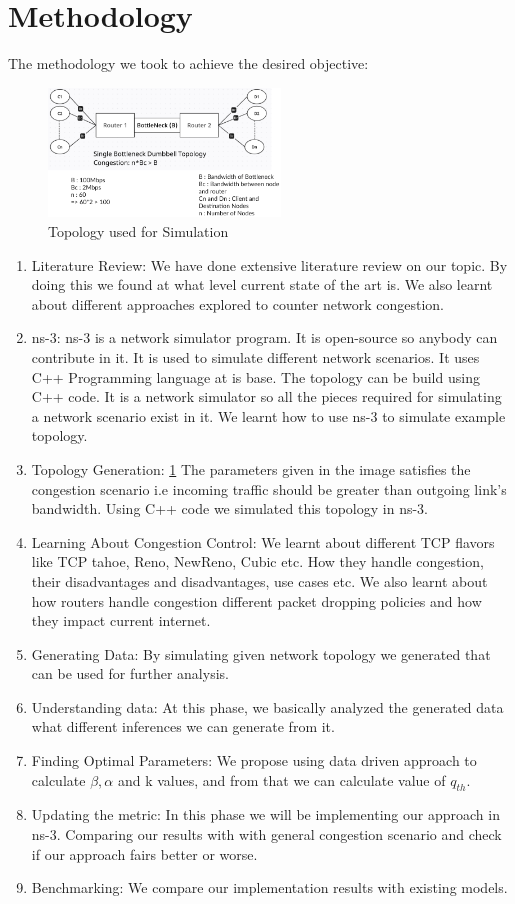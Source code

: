 \section{Methodology}
The methodology we took to achieve the desired objective:
\begin{figure}[h]
    \centering
    \includegraphics[width=0.55\textwidth]{./images/topology.png}
    \caption{\label{fig:myfig2} Topology used for Simulation}
\end{figure}
\begin{enumerate}
    \item Literature Review: We have done extensive literature review on our topic. By doing this we found at what level current state of the art is. We also learnt about different approaches explored to counter network congestion.
    \item ns-3: ns-3 is a network simulator program. It is open-source so anybody can contribute in it. It is used to simulate different network scenarios. It uses C++ Programming language at is base. The topology can be build using C++ code. It is a network simulator so all the pieces required for simulating a network scenario exist in it. We learnt how to use ns-3 to simulate example topology.
    \item Topology Generation: \ref{fig:myfig2} The parameters given in the image satisfies the congestion scenario i.e incoming traffic should be greater than outgoing link's bandwidth. Using C++ code we simulated this topology in ns-3.
    \item Learning About Congestion Control: We learnt about different TCP flavors like TCP tahoe, Reno, NewReno, Cubic etc. How they handle congestion, their disadvantages and disadvantages, use cases etc. We also learnt about how routers handle congestion different packet dropping policies and how they impact current internet.
    \item Generating Data: By simulating given network topology we generated that can be used for further analysis.
    \item Understanding data: At this phase, we basically analyzed the generated data what different inferences we can generate from it.
    \item Finding Optimal Parameters: We propose using data driven approach to calculate \( \beta, \alpha \) and k values, and from that we can calculate value of \( q_{th} \). 
    \item Updating the metric: In this phase we will be implementing our approach in ns-3. Comparing our results with with general congestion scenario and check if our approach fairs better or worse.
    \item Benchmarking: We compare our implementation results with existing models.
\end{enumerate}

